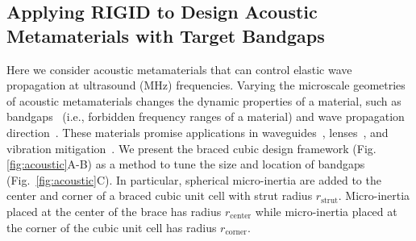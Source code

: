 \documentclass{article}
\begin{document}
\subsection{Applying RIGID to Design Acoustic Metamaterials with Target Bandgaps}
\label{sec:acoustic}
Here we consider acoustic metamaterials that can control elastic wave propagation at ultrasound (MHz) frequencies. Varying the microscale geometries of acoustic metamaterials changes the dynamic properties of a material, such as bandgaps~\cite{bayat2018wave} (i.e., forbidden frequency ranges of a material) and wave propagation direction~\cite{casadei_piezoelectric_2012}. 
These materials promise applications in waveguides~\cite{casadei_piezoelectric_2012,liu2020acoustic}, lenses~\cite{kim2021poroelastic,xie2018acoustic}, and vibration mitigation~\cite{krodel2015wide}. 
We present the braced cubic design framework (Fig. \ref{fig:acoustic}A-B) as a method to tune the size and location of bandgaps (Fig.~\ref{fig:acoustic}C). 
In particular, spherical micro-inertia are added to the center and corner of a braced cubic unit cell with strut radius $r_\text{strut}$. 
Micro-inertia placed at the center of the brace has radius $r_\text{center}$ while micro-inertia placed at the corner of the cubic unit cell has radius $r_\text{corner}$. 
\end{document}
